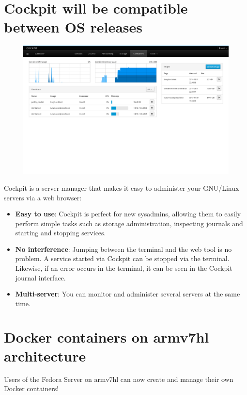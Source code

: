 \documentclass[
notumble,
letterpaper,
10pt
]{leaflet}
\begin{document}
\section{\textcolor{FedoraBlue}{Cockpit will be compatible between OS releases}}
\begin{figure}[h]
  \centering
  \includegraphics[keepaspectratio,width=\textwidth]{screenshot-docker.png}
\end{figure}
Cockpit is a server manager that makes it easy to administer your GNU/Linux servers via a web browser:
\begin{itemize}
  \item \textbf{Easy to use}: Cockpit is perfect for new sysadmins, allowing them to easily perform simple tasks such as storage administration, inspecting journals and starting and stopping services. 
  \item \textbf{No interference}: Jumping between the terminal and the web tool is no problem. A service started via Cockpit can be stopped via the terminal. Likewise, if an error occurs in the terminal, it can be seen in the Cockpit journal interface. 
  \item \textbf{Multi-server}: You can monitor and administer several servers at the same time.
\end{itemize}

\section{\textcolor{FedoraBlue}{Docker containers on armv7hl architecture}}
Users of the Fedora Server on armv7hl can now create and manage their own Docker containers!
\end{document}
